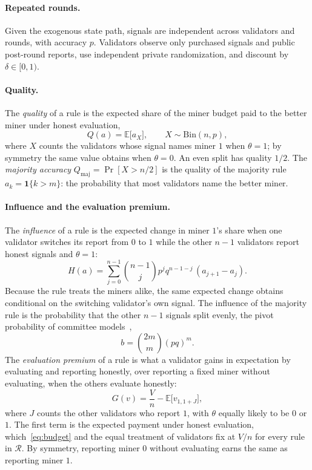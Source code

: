 \documentclass[sigconf,anonymous,review]{acmart}
\numberwithin{equation}{section}
\newcommand{\E}{\mathbb{E}}
\newcommand{\Qmaj}{Q_{\mathrm{maj}}}
\newcommand{\Rset}{\mathcal{R}}
\newcommand{\Bin}{\mathrm{Bin}}
\newcommand{\one}{\mathbf{1}}
\begin{document}
\paragraph{Repeated rounds.} Given the exogenous state path, signals are
independent across validators and rounds, with accuracy $p$. Validators
observe only purchased signals and public post-round reports, use independent
private randomization, and discount by $\delta\in[0,1)$.

\paragraph{Quality.} The \emph{quality} of a rule is the expected share of the
miner budget paid to the better miner under honest evaluation,
\begin{equation}\label{eq:quality}
Q(a)=\E\bigl[a_X\bigr],\qquad X\sim\Bin(n,p),
\end{equation}
where $X$ counts the validators whose signal names miner $1$ when $\theta=1$; by
symmetry the same value obtains when $\theta=0$. An even split has quality
$1/2$. The \emph{majority accuracy} $\Qmaj=\Pr[X>n/2]$ is the quality of the
majority rule $a_k=\one\{k>m\}$: the probability that most validators name the
better miner.

\paragraph{Influence and the evaluation premium.} The \emph{influence} of a
rule is the expected change in miner $1$'s share when one validator switches
its report from $0$ to $1$ while the other $n-1$ validators report honest
signals and $\theta=1$:
\begin{equation}\label{eq:influence}
H(a)=\sum_{j=0}^{n-1}\binom{n-1}{j}p^jq^{n-1-j}\,(a_{j+1}-a_j).
\end{equation}
Because the rule treats the miners alike, the same expected change obtains
conditional on the switching validator's own signal. The influence of the
majority rule is the probability that the other $n-1$ signals split evenly, the
pivot probability of committee
models~\cite{austensmith1996information,persico2004committee},
\begin{equation}\label{eq:pivot}
b=\binom{2m}{m}(pq)^m.
\end{equation}
The \emph{evaluation premium} of a rule is what a validator gains in
expectation by evaluating and reporting honestly, over reporting a fixed miner
without evaluating, when the others evaluate honestly:
\begin{equation}\label{eq:premium}
G(v)=\frac Vn-\E\bigl[v_{1,1+J}\bigr],
\end{equation}
where $J$ counts the other validators who report $1$, with $\theta$ equally
likely to be $0$ or $1$. The first term is the expected payment under honest
evaluation, which~\eqref{eq:budget} and the equal treatment of validators fix at
$V/n$ for every rule in $\Rset$. By symmetry, reporting miner $0$ without
evaluating earns the same as reporting miner $1$.
\end{document}
